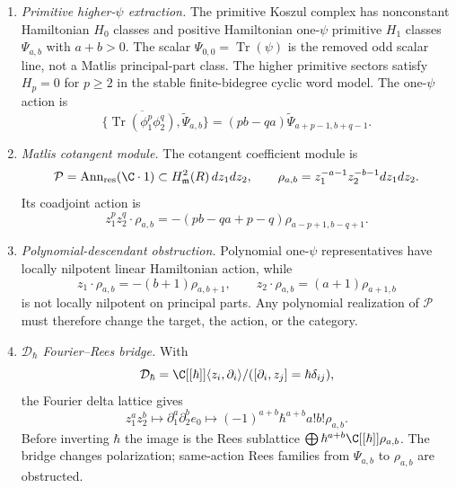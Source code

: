 \begin{enumerate}
  \item \emph{Primitive higher-\(\psi\) extraction.}
  The primitive Koszul complex has nonconstant Hamiltonian \(H_0\)
  classes and positive Hamiltonian one-\(\psi\) primitive \(H_1\)
  classes \(\Psi_{a,b}\) with \(a+b>0\).  The scalar
  \(\Psi_{0,0}=\operatorname{Tr}(\psi)\) is the removed odd scalar line,
  not a Matlis principal-part class.  The higher primitive sectors
  satisfy \(H_p=0\) for \(p\ge2\) in the stable finite-bidegree cyclic
  word model.  The
  one-\(\psi\) action is
  \[
    \{\overline{\operatorname{Tr}(\phi_1^p\phi_2^q)},
      \widetilde\Psi_{a,b}\}
    =(pb-qa)\widetilde\Psi_{a+p-1,b+q-1}.
  \]

  \item \emph{Matlis cotangent module.}
  The cotangent coefficient module is
  \[
    \mathcal P=
    \operatorname{Ann}_{\mathrm{res}}(\C\cdot1)
    \subset H^2_{\mathfrak m}(R)\,dz_1dz_2,
    \qquad
    \rho_{a,b}=z_1^{-a-1}z_2^{-b-1}dz_1dz_2 .
  \]
  Its coadjoint action is
  \[
    z_1^pz_2^q\cdot\rho_{a,b}
    =-(pb-qa+p-q)\rho_{a-p+1,b-q+1}.
  \]

  \item \emph{Polynomial-descendant obstruction.}
  Polynomial one-\(\psi\) representatives have locally nilpotent linear
  Hamiltonian action, while
  \[
    z_1\cdot\rho_{a,b}=-(b+1)\rho_{a,b+1},\qquad
    z_2\cdot\rho_{a,b}=(a+1)\rho_{a+1,b}
  \]
  is not locally nilpotent on principal parts.  Any polynomial
  realization of \(\mathcal P\) must therefore change the target, the
  action, or the category.

  \item \emph{\(\mathcal D_\hbar\) Fourier--Rees bridge.}
  With
  \[
    \mathcal D_\hbar=
    \C[[\hbar]]\langle z_i,\partial_i\rangle/
    ([\partial_i,z_j]=\hbar\delta_{ij}),
  \]
  the Fourier delta lattice gives
  \[
    z_1^az_2^b\mapsto\partial_1^a\partial_2^be_0
    \mapsto(-1)^{a+b}\hbar^{a+b}a!b!\rho_{a,b}.
  \]
  Before inverting \(\hbar\) the image is the Rees sublattice
  \(\bigoplus\hbar^{a+b}\C[[\hbar]]\rho_{a,b}\).  The bridge changes
  polarization; same-action Rees families from \(\Psi_{a,b}\) to
  \(\rho_{a,b}\) are obstructed.


\end{enumerate}
